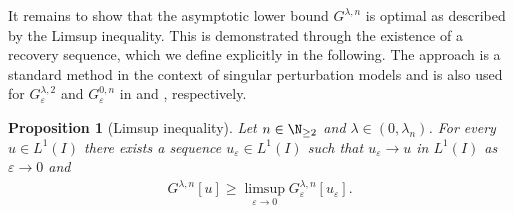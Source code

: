 \documentclass{article}
\newcommand{\lam}{\lambda}
\newcommand{\eps}{\varepsilon}
\numberwithin{figure}{section}
\newtheorem{prop}[theorem]{Proposition}
\numberwithin{equation}{section}
\begin{document}
 It remains to show that the asymptotic lower bound $G^{\lam,n}$ is optimal as described by the Limsup inequality. This is demonstrated through the existence of a recovery sequence, which we define explicitly in the following. The approach is a standard method in the context of singular perturbation models and is also used for $G^{\lam,2}_\eps$ and $G^{0,n}_\eps$ in \cite[Theorem~4.1]{CicSpaZep} and \cite[Proposition 5.3]{BruDonSol}, respectively.

\begin{prop}[Limsup inequality] \label{prop:limsup_inequality}
    Let $n \in \N_{\geq2}$ and $\lam \in (0,\lam_n)$. For every $u\in L^1(I)$ there exists a sequence $u_\eps \in L^1(I)$ such that $u_\eps \to u$ in $L^1(I)$ as $\eps \to 0$ and
    \begin{align}
        G^{\lam,n}[u] \geq \limsup_{\eps \to 0} G^{\lam,n}_\eps[u_\eps].
    \end{align}
\end{prop}
\end{document}
